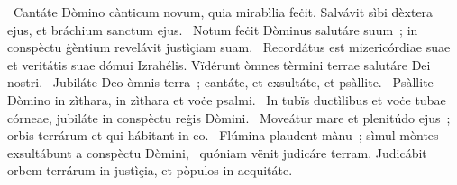 ~Cantáte Dòmino cànticum novum, quia mirabìlia feċit. Salvávit sìbi dèxtera ejus, et bráchium sanctum ejus. 
~Notum feċit Dòminus salutáre suum~; in conspèctu ġèntium revelávit justìçiam suam. 
~Recordátus est mizericórdiae suae et veritátis suae dómui Izrahélis. Vïdérunt òmnes tèrmini terrae salutáre Dei nostri. 
~Jubiláte Deo òmnis terra~; cantáte, et exsultáte, et psàllite. 
~Psàllite Dòmino in zìthara, in zìthara et voċe psalmi. 
~In tubïs ductìlibus et voċe tubae córneae, jubiláte in conspèctu reġis Dòmini. 
~Moveátur mare et plenitúdo ejus~; orbis terrárum et qui hábitant in eo. 
~Flúmina plaudent mànu~; sìmul mòntes exsultábunt a conspèctu Dòmini, 
~quóniam vënit judicáre terram. Judicábit orbem terrárum in justìçia, et pòpulos in aequitáte. 
